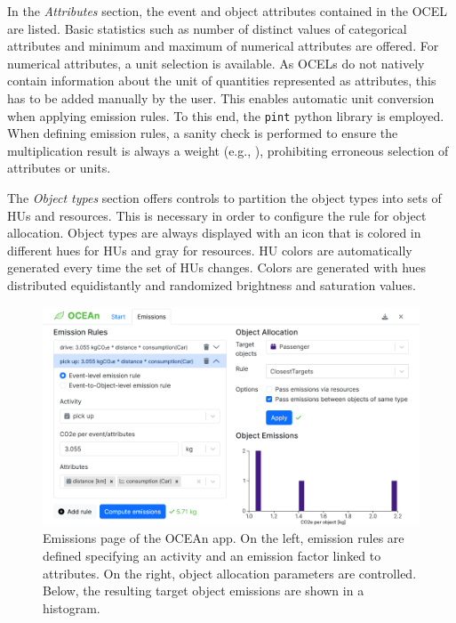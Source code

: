 In the \textit{Attributes} section, the event and object attributes contained in the OCEL are listed. Basic statistics such as number of distinct values of categorical attributes and minimum and maximum of numerical attributes are offered. For numerical attributes, a unit selection is available. As OCELs do not natively contain information about the unit of quantities represented as attributes, this has to be added manually by the user.
This enables automatic unit conversion when applying emission rules. To this end, the \texttt{pint} python library is employed.
When defining emission rules, a sanity check is performed to ensure the multiplication result is always a weight (e.g., \unit{\kgcotwoe}), prohibiting erroneous selection of attributes or units.

The \textit{Object types} section offers controls to partition the object types into sets of HUs and resources. This is necessary in order to configure the  rule for object allocation.
Object types are always displayed with an icon that is colored in different hues for HUs and gray for resources. HU colors are automatically generated every time the set of HUs changes. Colors are generated with hues distributed equidistantly and randomized brightness and saturation values.

\begin{figure}[t]
  \begin{small}
    \begin{center}
      \includegraphics[width=\textwidth]{figures/screenshots/20240901-ocean-emissions.png}
    \end{center}
    \caption{Emissions page of the OCEAn app. On the left, emission rules are defined specifying an activity and an emission factor linked to attributes. On the right, object allocation parameters are controlled. Below, the resulting target object emissions are shown in a histogram.}
    \label{fig:app-screen-emissions}
  \end{small}
\end{figure}

